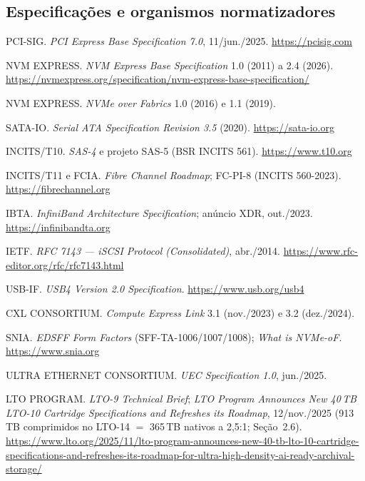 \documentclass[11pt,a4paper]{article}
\begin{document}
\subsection*{Especificações e organismos normatizadores}
\begin{enumerate}[label={[\arabic*]},leftmargin=*,start=4]
\item PCI-SIG. \emph{PCI Express Base Specification 7.0}, 11/jun./2025. \url{https://pcisig.com}
\item NVM EXPRESS. \emph{NVM Express Base Specification} 1.0 (2011) a 2.4 (2026).
      \url{https://nvmexpress.org/specification/nvm-express-base-specification/}
\item NVM EXPRESS. \emph{NVMe over Fabrics} 1.0 (2016) e 1.1 (2019).
\item SATA-IO. \emph{Serial ATA Specification Revision 3.5} (2020). \url{https://sata-io.org}
\item INCITS/T10. \emph{SAS-4} e projeto SAS-5 (BSR INCITS 561). \url{https://www.t10.org}
\item INCITS/T11 e FCIA. \emph{Fibre Channel Roadmap}; FC-PI-8 (INCITS 560-2023).
      \url{https://fibrechannel.org}
\item IBTA. \emph{InfiniBand Architecture Specification}; anúncio XDR, out./2023.
      \url{https://infinibandta.org}
\item IETF. \emph{RFC 7143 --- iSCSI Protocol (Consolidated)}, abr./2014.
      \url{https://www.rfc-editor.org/rfc/rfc7143.html}
\item USB-IF. \emph{USB4 Version 2.0 Specification}. \url{https://www.usb.org/usb4}
\item CXL CONSORTIUM. \emph{Compute Express Link} 3.1 (nov./2023) e 3.2 (dez./2024).
\item SNIA. \emph{EDSFF Form Factors} (SFF-TA-1006/1007/1008); \emph{What is NVMe-oF}.
      \url{https://www.snia.org}
\item ULTRA ETHERNET CONSORTIUM. \emph{UEC Specification 1.0}, jun./2025.
\item LTO PROGRAM. \emph{LTO-9 Technical Brief}; \emph{LTO Program Announces New 40\,TB LTO-10
      Cartridge Specifications and Refreshes its Roadmap}, 12/nov./2025 (913\,TB comprimidos
      no LTO-14 $=$ 365\,TB nativos a 2,5:1; Seção~2.6).
      \url{https://www.lto.org/2025/11/lto-program-announces-new-40-tb-lto-10-cartridge-specifications-and-refreshes-its-roadmap-for-ultra-high-density-ai-ready-archival-storage/}
\end{enumerate}
\end{document}
